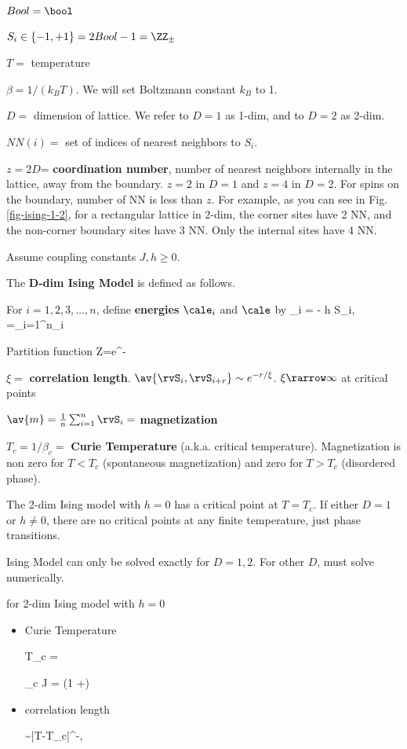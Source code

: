 $Bool=\bool$

 
$S_i\in \{-1, +1\} =2 Bool-1=\ZZ_\pm$

$T=$ temperature

$
\beta = 1/(k_B T)
$. We will set Boltzmann constant $k_B$  to 1.

$D=$ dimension of lattice. We refer to $D=1$ as 1-dim, and to $D=2$ as 2-dim.

$NN(i)=$ set of indices of nearest neighbors 
to $S_i$.

$z=2D$= {\bf coordination number},
number of nearest neighbors
internally in the lattice, away from the boundary. 
$z=2$ in $D=1$ and $z=4$ in $D=2$.
For spins on the boundary, number of NN
is less than $z$. For example, as you 
can see in Fig.\ref{fig-ising-1-2}, for a rectangular lattice 
in 2-dim, the corner sites have 2 NN, and the non-corner
boundary sites have 3 NN. Only the internal sites have 4 NN.

Assume coupling constants $J, h\geq 0$.

The {\bf D-dim Ising Model} is defined as follows.

For $i=1, 2,3, \ldots, n$, 
define {\bf energies} $\cale_i$ and $\cale$ by
\beq
\cale_i = - h S_{i},
\quad
\cale=\sum_{i=1}^n\cale_i
\eeq


Partition function
\beq
Z=\left[\prod_{i=1}^n\sum_{S_i\in\ZZ_\pm}
\right]
e^{-\beta \cale}
\eeq

$\xi=$ {\bf correlation length}. $\av{\rvS_i, \rvS_{i+r}}\sim e^{-r/\xi}$. $\xi\rarrow \infty$ at critical points

$\av{m}=\frac{1}{n}\sum_{i=1}^n\rvS_i=$ {\bf magnetization}

$T_c= 1/\beta_c=$ {\bf Curie Temperature} (a.k.a. critical temperature). Magnetization is non zero for $T< T_c$ (spontaneous magnetization) and zero for $T>T_c$ (disordered phase).

The 2-dim Ising model with $h=0$ has a critical
point at $T=T_c$.
If either $D=1$ or $h\neq 0$,
 there are no critical 
points at any finite temperature, just phase transitions.



Ising Model can only be solved
exactly for $D=1, 2$. 
For other $D$, must solve numerically.

for 2-dim Ising model with $h=0$

\begin{itemize}
\item Curie Temperature

  \beq
  T_c = 
  \eeq

\beq
\beta_c J = \ln(1 +)
\eeq

\item correlation length

\beq
\xi \sim |T-T_c|^{-\nu},\quad {}
\eeq


\end{itemize}












